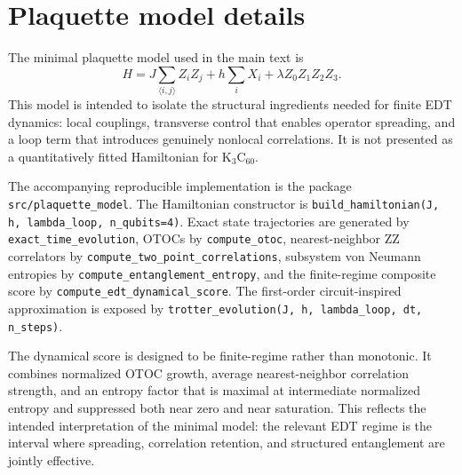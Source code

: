 \section{Plaquette model details}

The minimal plaquette model used in the main text is
\begin{equation}
H =
J \sum_{\langle i,j\rangle} Z_i Z_j
+
h \sum_i X_i
+
\lambda Z_0 Z_1 Z_2 Z_3.
\end{equation}
This model is intended to isolate the structural ingredients needed for finite EDT dynamics: local couplings, transverse control that enables operator spreading, and a loop term that introduces genuinely nonlocal correlations. It is not presented as a quantitatively fitted Hamiltonian for K$_3$C$_{60}$.

The accompanying reproducible implementation is the package \texttt{src/plaquette\_model}. The Hamiltonian constructor is \texttt{build\_hamiltonian(J, h, lambda\_loop, n\_qubits=4)}. Exact state trajectories are generated by \texttt{exact\_time\_evolution}, OTOCs by \texttt{compute\_otoc}, nearest-neighbor ZZ correlators by \texttt{compute\_two\_point\_correlations}, subsystem von Neumann entropies by \texttt{compute\_entanglement\_entropy}, and the finite-regime composite score by \texttt{compute\_edt\_dynamical\_score}. The first-order circuit-inspired approximation is exposed by \texttt{trotter\_evolution(J, h, lambda\_loop, dt, n\_steps)}.

The dynamical score is designed to be finite-regime rather than monotonic. It combines normalized OTOC growth, average nearest-neighbor correlation strength, and an entropy factor that is maximal at intermediate normalized entropy and suppressed both near zero and near saturation. This reflects the intended interpretation of the minimal model: the relevant EDT regime is the interval where spreading, correlation retention, and structured entanglement are jointly effective.

